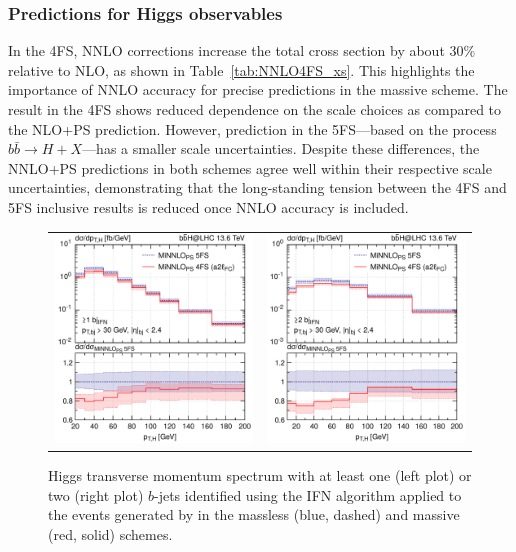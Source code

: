 \documentclass[11pt,a4paper]{article}
\begin{document}
\subsubsection*{Predictions for Higgs observables}
In the 4FS, NNLO corrections increase the total cross section by about 30\% relative to NLO, as shown in Table~\ref{tab:NNLO4FS_xs}. This highlights the importance of NNLO accuracy for precise predictions in the massive scheme. The \minnlo{} result in the 4FS shows reduced dependence on the scale choices as compared to the NLO+PS prediction. However, \minnlo{} prediction in the 5FS—based on the process \(b\bar{b} \to H+X\)—has a smaller scale uncertainties. 
Despite these differences, the NNLO+PS predictions in both schemes agree well within their respective scale uncertainties, demonstrating that the long-standing tension between the 4FS and 5FS inclusive results is reduced once NNLO accuracy is included.
\begin{figure}[t!]
\begin{center}
\begin{tabular}{cc}
\includegraphics[width=.45\textwidth, page=1]{plots/4fs/pt_H-IFN-1bjet_minnlops-FC.pdf}&
\includegraphics[width=.45\textwidth, page=1]{plots/4fs/pt_H-IFN-2bjet_minnlops-FC.pdf}
\end{tabular}
\vspace*{1ex}
\caption{Higgs transverse momentum spectrum with at least one (left plot) or two (right plot) $b$-jets identified using the IFN algorithm applied to the events generated by \minnlo{} in the massless (blue, dashed) and massive (red, solid) schemes.\label{fig:4fsB}}
\end{center}
\end{figure}
\end{document}
